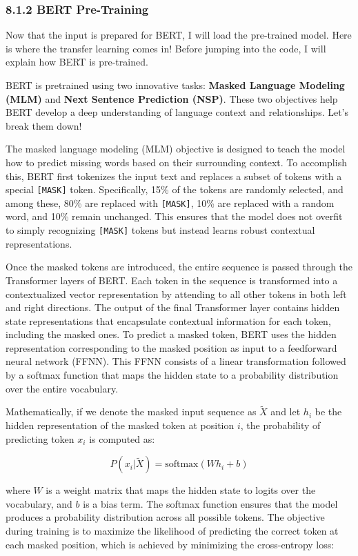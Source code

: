 \documentclass[11pt]{article}
\begin{document}
    \subsubsection{8.1.2 BERT Pre-Training}\label{bert-pre-training}

Now that the input is prepared for BERT, I will load the pre-trained
model. Here is where the transfer learning comes in! Before jumping into
the code, I will explain how BERT is pre-trained.

BERT is pretrained using two innovative tasks: \textbf{Masked Language
Modeling (MLM)} and \textbf{Next Sentence Prediction (NSP)}. These two
objectives help BERT develop a deep understanding of language context
and relationships. Let's break them down!

The masked language modeling (MLM) objective is designed to teach the
model how to predict missing words based on their surrounding context.
To accomplish this, BERT first tokenizes the input text and replaces a
subset of tokens with a special \texttt{{[}MASK{]}} token. Specifically,
15\% of the tokens are randomly selected, and among these, 80\% are
replaced with \texttt{{[}MASK{]}}, 10\% are replaced with a random word,
and 10\% remain unchanged. This ensures that the model does not overfit
to simply recognizing \texttt{{[}MASK{]}} tokens but instead learns
robust contextual representations.

Once the masked tokens are introduced, the entire sequence is passed
through the Transformer layers of BERT. Each token in the sequence is
transformed into a contextualized vector representation by attending to
all other tokens in both left and right directions. The output of the
final Transformer layer contains hidden state representations that
encapsulate contextual information for each token, including the masked
ones. To predict a masked token, BERT uses the hidden representation
corresponding to the masked position as input to a feedforward neural
network (FFNN). This FFNN consists of a linear transformation followed
by a softmax function that maps the hidden state to a probability
distribution over the entire vocabulary.

Mathematically, if we denote the masked input sequence as \(\tilde{X}\)
and let \(h_i\) be the hidden representation of the masked token at
position \(i\), the probability of predicting token \(x_i\) is computed
as:

\[
P(x_i | \tilde{X}) = \text{softmax}(W h_i + b)
\]

where \(W\) is a weight matrix that maps the hidden state to logits over
the vocabulary, and \(b\) is a bias term. The softmax function ensures
that the model produces a probability distribution across all possible
tokens. The objective during training is to maximize the likelihood of
predicting the correct token at each masked position, which is achieved
by minimizing the cross-entropy loss:
\end{document}
